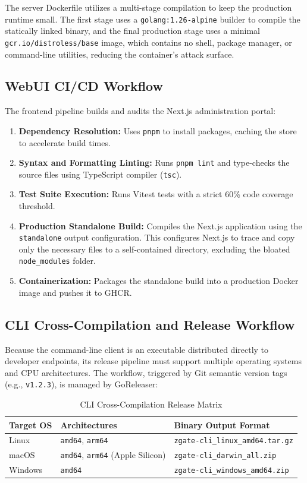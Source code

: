 The server Dockerfile utilizes a multi-stage compilation to keep the production runtime small. The first stage uses a \texttt{golang:1.26-alpine} builder to compile the statically linked binary, and the final production stage uses a minimal \texttt{gcr.io/distroless/base} image, which contains no shell, package manager, or command-line utilities, reducing the container's attack surface.

\subsection{WebUI CI/CD Workflow}
The frontend pipeline builds and audits the Next.js administration portal:
\begin{enumerate}
    \item \textbf{Dependency Resolution:} Uses \texttt{pnpm} to install packages, caching the store to accelerate build times.
    \item \textbf{Syntax and Formatting Linting:} Runs \texttt{pnpm lint} and type-checks the source files using TypeScript compiler (\texttt{tsc}).
    \item \textbf{Test Suite Execution:} Runs Vitest tests with a strict 60\% code coverage threshold.
    \item \textbf{Production Standalone Build:} Compiles the Next.js application using the \texttt{standalone} output configuration. This configures Next.js to trace and copy only the necessary files to a self-contained directory, excluding the bloated \texttt{node\_modules} folder.
    \item \textbf{Containerization:} Packages the standalone build into a production Docker image and pushes it to GHCR.
\end{enumerate}

\subsection{CLI Cross-Compilation and Release Workflow}
Because the command-line client is an executable distributed directly to developer endpoints, its release pipeline must support multiple operating systems and CPU architectures. The workflow, triggered by Git semantic version tags (e.g., \texttt{v1.2.3}), is managed by GoReleaser:

\begin{table}[H]
\centering
\caption{CLI Cross-Compilation Release Matrix}
\label{tab:cli-matrix}
\begin{tabular}{|l|l|l|}
\hline
\textbf{Target OS} & \textbf{Architectures} & \textbf{Binary Output Format} \\
\hline
Linux & \texttt{amd64}, \texttt{arm64} & \texttt{zgate-cli\_linux\_amd64.tar.gz} \\
macOS & \texttt{amd64}, \texttt{arm64} (Apple Silicon) & \texttt{zgate-cli\_darwin\_all.zip} \\
Windows & \texttt{amd64} & \texttt{zgate-cli\_windows\_amd64.zip} \\
\hline
\end{tabular}
\end{table}

